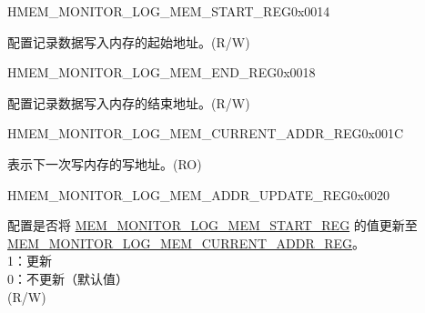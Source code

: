\begin{register}{H}{MEM\_MONITOR\_LOG\_MEM\_START\_REG}{0x0014}\label{regdesc:MEMMONITORLOGMEMSTARTREG}
%
\regnewline%
\begin{regdesc}\begin{reglist}
\label{fielddesc:MEMMONITORLOGMEMSTART}\item [MEM\_MONITOR\_LOG\_MEM\_START] 配置记录数据写入内存的起始地址。(R/W)
\end{reglist}\end{regdesc}
\end{register}


\begin{register}{H}{MEM\_MONITOR\_LOG\_MEM\_END\_REG}{0x0018}\label{regdesc:MEMMONITORLOGMEMENDREG}
%
\regnewline%
\begin{regdesc}\begin{reglist}
\label{fielddesc:MEMMONITORLOGMEMEND}\item [MEM\_MONITOR\_LOG\_MEM\_END] 配置记录数据写入内存的结束地址。(R/W)
\end{reglist}\end{regdesc}
\end{register}


\begin{register}{H}{MEM\_MONITOR\_LOG\_MEM\_CURRENT\_ADDR\_REG}{0x001C}\label{regdesc:MEMMONITORLOGMEMCURRENTADDRREG}
%
\regnewline%
\begin{regdesc}\begin{reglist}
\label{fielddesc:MEMMONITORLOGMEMCURRENTADDR}\item [MEM\_MONITOR\_LOG\_MEM\_CURRENT\_ADDR] 表示下一次写内存的写地址。(RO)
\end{reglist}\end{regdesc}
\end{register}

\begin{register}{H}{MEM\_MONITOR\_LOG\_MEM\_ADDR\_UPDATE\_REG}{0x0020}\label{regdesc:MEMMONITORLOGMEMADDRUPDATEREG}
%
%
\regnewline%
\begin{regdesc}\begin{reglist}
\label{fielddesc:MEMMONITORCLRLOGMEMADDRUPDATE}\item [MEM\_MONITOR\_LOG\_MEM\_ADDR\_UPDATE] 配置是否将 \hyperref[fielddesc:MEMMONITORLOGMEMSTART]{MEM\_MONITOR\_LOG\_MEM\_START\_REG} 的值更新至 \hyperref[fielddesc:MEMMONITORLOGMEMCURRENTADDR]{MEM\_MONITOR\_LOG\_MEM\_CURRENT\_ADDR\_REG}。\\
1：更新\\
0：不更新（默认值）\\
(R/W)
\end{reglist}\end{regdesc}
\end{register}

